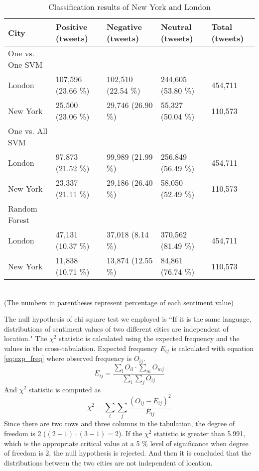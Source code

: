 \begin{table}[ht]
	\caption{Classification results of New York and London}
	\begin{tabular}{|l|p{1.8cm}|p{1.8cm}|p{1.8cm}|p{1.8cm}|} \hline
	City&Positive (tweets)&Negative (tweets)&Neutral (tweets)&Total (tweets)\\ \hline
	One vs. One SVM & {} & {} & {} & {}\\ \hline
London & 107,596 (23.66 \%) & 102,510 (22.54 \%) & 244,605 (53.80 \%)& 454,711 \\ \hline
New York & 25,500 (23.06 \%) & 29,746 (26.90 \%)& 55,327 (50.04 \%)& 110,573 \\ \hline
	One vs. All SVM & {} & {} & {} & {}\\ \hline

London & 97,873 (21.52 \%) & 99,989 (21.99 \%) & 256,849 (56.49 \%)& 454,711 \\ \hline

New York & 23,337 (21.11 \%)& 29,186 (26.40 \%)& 58,050 (52.49 \%)& 110,573 \\ \hline
	Random Forest & {} & {} & {} & {}\\ \hline

London & 47,131 (10.37 \%)  & 37,018 (8.14 \%)  & 370,562 (81.49 \%) & 454,711 \\ \hline

New York  & 11,838 (10.71 \%)& 13,874 (12.55 \%)& 84,861 (76.74 \%)& 110,573 \\ \hline
	\end{tabular}
	\label{tab:result_london_ny}
	\\(The numbers in parentheses represent percentage of each sentiment value)
\end{table}

The null hypothesis of chi square test we employed is ``If it is the same language, distributions of sentiment values of two different cities are independent of location."
The $\chi^2$ statistic is calculated using the expected frequency and the values in the cross-tabulation.
Expected frequency $E_{ij}$ is calculated with equation \ref{eq:exp_freq} where observed frequency is $O_{ij}$.
\begin{equation}
E_{ij} = \frac{\sum_{l} O_{il} \cdot \sum_{m} O_{mj}}{\sum_{i} \sum_{j} O_{ij}}
\label{eq:exp_freq}
\end{equation}
And $\chi^2$ statistic is computed as 
\begin{equation}
\chi^2 = \sum_{i} \sum_{j} \frac{(O_{ij} - E_{ij})^2}{E_{ij}}
\end{equation}
Since there are two rows and three columns in the tabulation, the degree of freedom is 2 ($(2 - 1 ) \cdot  (3 - 1) = 2$).
If the $\chi^2$ statistic is greater than 5.991, which is the appropriate critical value at a 5 \% level of significance when degree of freedom is 2, the null hypothesis is rejected.
And then it is concluded that the distributions between the two cities are not independent of location. 

